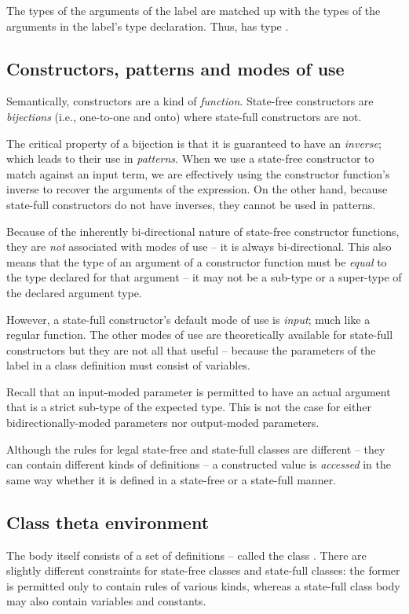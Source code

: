 The types of the arguments of the label are matched up with the types of the arguments in the label's type declaration. Thus, \emph{} has type . 

\subsection{Constructors, patterns and modes of use}
Semantically, constructors are a kind of \emph{function}. State-free constructors are \emph{bijections} (i.e., one-to-one and onto) where state-full constructors are not.

The critical property of a bijection is that it is guaranteed to have an \emph{inverse}; which leads to their use in \emph{patterns}. When we use a state-free constructor to match against an input term, we are effectively using the constructor function's inverse to recover the arguments of the expression. On the other hand, because state-full constructors do not have inverses, they cannot be used in patterns.

Because of the inherently bi-directional nature of state-free constructor functions, they are \emph{not} associated with modes of use -- it is always bi-directional. This also means that the type of an argument of a constructor function must be \emph{equal} to the type declared for that argument -- it may not be a sub-type or a super-type of the declared argument type.

However, a state-full constructor's default mode of use is \emph{input}; much like a regular function. The other modes of use are theoretically available for state-full constructors but they are not all that useful -- because the parameters of the label in a class definition must consist of variables.

Recall that an input-moded parameter is permitted to have an actual argument that is a strict sub-type of the expected type. This is not the case for either bidirectionally-moded parameters nor output-moded parameters.

Although the rules for legal state-free and state-full classes are different -- they can contain different kinds of definitions -- a constructed value is \emph{accessed} in the same way whether it is defined in a state-free or a state-full manner. 

\subsection{Class theta environment}
The body itself consists of a set of definitions -- called the class . There are slightly different constraints for state-free classes and state-full classes: the former is permitted only to contain rules of various kinds, whereas a state-full class body may also contain variables and constants.

